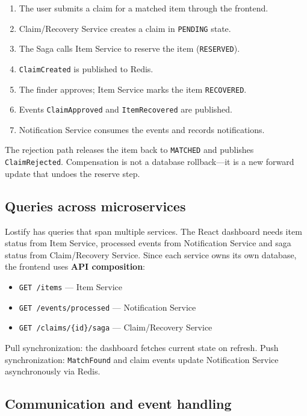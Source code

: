 \documentclass[11pt,a4paper]{article}
\begin{document}
\begin{enumerate}
    \item The user submits a claim for a matched item through the frontend.
    \item Claim/Recovery Service creates a claim in \texttt{PENDING} state.
    \item The Saga calls Item Service to reserve the item (\texttt{RESERVED}).
    \item \texttt{ClaimCreated} is published to Redis.
    \item The finder approves; Item Service marks the item \texttt{RECOVERED}.
    \item Events \texttt{ClaimApproved} and \texttt{ItemRecovered} are published.
    \item Notification Service consumes the events and records notifications.
\end{enumerate}

The rejection path releases the item back to \texttt{MATCHED} and publishes \texttt{ClaimRejected}.
Compensation is not a database rollback---it is a new forward update that undoes the reserve step.

\subsection{Queries across microservices}

Lostify has queries that span multiple services. The React dashboard needs item status from Item
Service, processed events from Notification Service and saga status from Claim/Recovery Service.
Since each service owns its own database, the frontend uses \textbf{API composition}:

\begin{itemize}
    \item \texttt{GET /items} --- Item Service
    \item \texttt{GET /events/processed} --- Notification Service
    \item \texttt{GET /claims/\{id\}/saga} --- Claim/Recovery Service
\end{itemize}

Pull synchronization: the dashboard fetches current state on refresh.
Push synchronization: \texttt{MatchFound} and claim events update Notification Service asynchronously via Redis.

\subsection{Communication and event handling}
\end{document}
